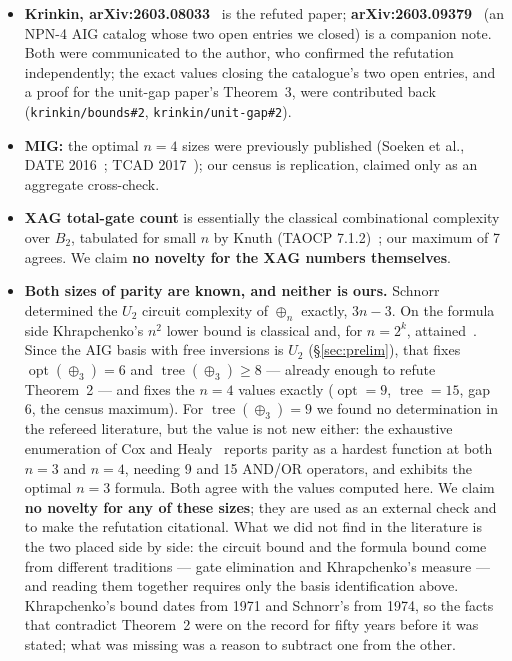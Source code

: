 \documentclass[11pt]{article}
\DeclareMathOperator{\opt}{opt}
\DeclareMathOperator{\tree}{tree}
\theoremstyle{plain}
\begin{document}
\begin{itemize}
  \item \textbf{Krinkin, arXiv:2603.08033}~\cite{krinkin-unitgap} is the refuted paper;
  \textbf{arXiv:2603.09379}~\cite{krinkin-catalog} (an NPN-4 AIG catalog whose two open entries we
  closed) is a companion note. Both were communicated to the author, who
  confirmed the refutation independently; the exact values closing the catalogue's two open
  entries, and a proof for the unit-gap paper's Theorem~3, were contributed back
  (\texttt{krinkin/bounds\#2}, \texttt{krinkin/unit-gap\#2}).

  \item \textbf{MIG:} the optimal $n = 4$ sizes were previously published (Soeken et al., DATE
  2016~\cite{soeken2016}; TCAD 2017~\cite{soeken2017}); our census is replication, claimed only as
  an aggregate cross-check.

  \item \textbf{XAG total-gate count} is essentially the classical combinational complexity over
  $B_2$, tabulated for small $n$ by Knuth (TAOCP 7.1.2)~\cite{knuth-taocp4a}; our maximum of 7
  agrees. We claim \textbf{no novelty for the XAG numbers themselves}.

  \item \textbf{Both sizes of parity are known, and neither is ours.} Schnorr~\cite{schnorr1974}
  determined the $U_2$ circuit complexity of $\oplus_n$ exactly, $3n-3$. On the formula side
  Khrapchenko's $n^2$ lower bound is classical and, for $n = 2^k$, attained~\cite{tarui2010}.
  Since the AIG basis with free inversions is $U_2$ (\S\ref{sec:prelim}), that fixes
  $\opt(\oplus_3) = 6$ and $\tree(\oplus_3) \ge 8$ --- already enough to refute Theorem~2 --- and
  fixes the $n = 4$ values exactly ($\opt = 9$, $\tree = 15$, gap 6, the census maximum). For
  $\tree(\oplus_3) = 9$ we found no determination in the refereed literature, but the value is not
  new either: the exhaustive enumeration of Cox and Healy~\cite{cox2011} reports parity as a
  hardest function at both $n = 3$ and $n = 4$, needing 9 and 15 AND/OR operators, and exhibits
  the optimal $n = 3$ formula. Both agree with the values computed here. We claim \textbf{no
  novelty for any of these sizes}; they are used as an external check and to make the refutation
  citational. What
  we did not find in the literature is the two placed side by side: the circuit bound and the
  formula bound come from different traditions --- gate elimination and Khrapchenko's measure ---
  and reading them together requires only the basis identification above. Khrapchenko's bound
  dates from 1971 and Schnorr's from 1974, so the facts that contradict Theorem~2 were on the
  record for fifty years before it was stated; what was missing was a reason to subtract one
  from the other.


\end{itemize}
\end{document}
